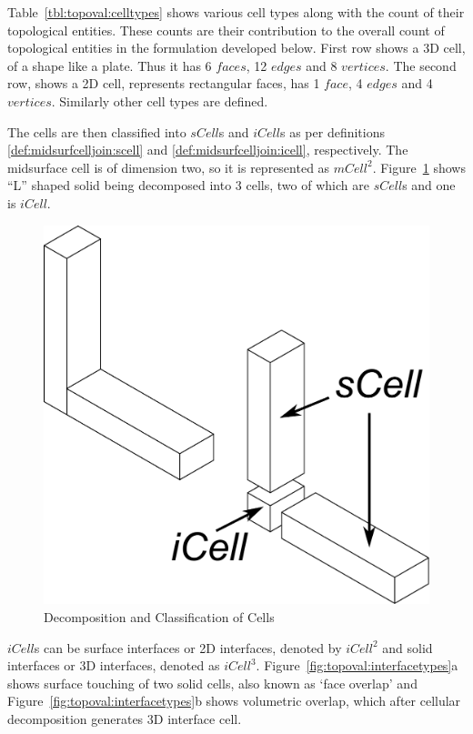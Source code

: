 \bigskip

Table~\ref{tbl:topoval:celltypes} shows various cell types along with the count of their topological entities. These counts are their contribution to the overall count of topological entities in the formulation developed below. First row shows a 3D cell, of a shape like a plate. Thus it has 6 $faces$, 12 $edges$ and 8 $vertices$. The second row, shows a 2D cell, represents rectangular faces, has 1 $face$, 4 $edges$ and 4 $vertices$. Similarly other cell types are defined.

The cells are then classified into $sCell$s and $iCell$s as per definitions \ref{def:midsurfcelljoin:scell} and \ref{def:midsurfcelljoin:icell}, respectively. The midsurface cell is of dimension two, so it is represented as $mCell^2$. Figure~\ref{fig:topoval:treekexample} shows ``L'' shaped solid being decomposed into  3 cells, two of which are $sCell$s and one is $iCell$.

\begin{figure}[!h]
\centering     %
\includegraphics[width=0.25\linewidth]{images/CellDecompExample.pdf}
\caption{Decomposition and Classification of Cells}
\label{fig:topoval:treekexample}
\end{figure}


$iCell$s can be surface interfaces or 2D interfaces, denoted by $iCell^2$ and solid interfaces or 3D interfaces, denoted as $iCell^3$. Figure~\ref{fig:topoval:interfacetypes}a shows surface touching of two solid cells, also known as `face overlap' and  Figure~\ref{fig:topoval:interfacetypes}b shows volumetric overlap, which after cellular decomposition generates 3D interface cell.

